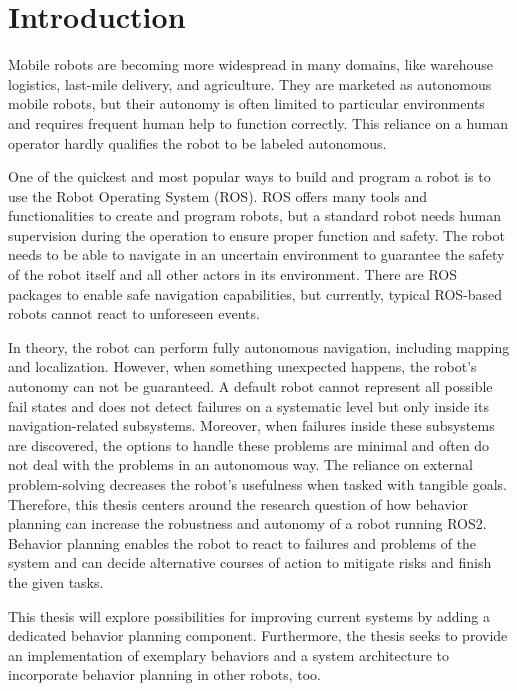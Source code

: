 \chapter{Introduction}
\label{cha:introduction}

Mobile robots are becoming more widespread in many domains, like warehouse logistics, last-mile delivery, and agriculture. They are marketed as autonomous mobile robots, but their autonomy is often limited to particular environments and requires frequent human help to function correctly. This reliance on a human operator hardly qualifies the robot to be labeled autonomous. 

One of the quickest and most popular ways to build and program a robot is to use the Robot Operating System (ROS). ROS offers many tools and functionalities to create and program robots, but a standard robot needs human supervision during the operation to ensure proper function and safety. The robot needs to be able to navigate in an uncertain environment to guarantee the safety of the robot itself and all other actors in its environment. There are ROS packages to enable safe navigation capabilities, but currently, typical ROS-based robots cannot react to unforeseen events.

In theory, the robot can perform fully autonomous navigation, including mapping and localization. However, when something unexpected happens, the robot's autonomy can not be guaranteed. A default robot cannot represent all possible fail states and does not detect failures on a systematic level but only inside its navigation-related subsystems. Moreover, when failures inside these subsystems are discovered, the options to handle these problems are minimal and often do not deal with the problems in an autonomous way. The reliance on external problem-solving decreases the robot's usefulness when tasked with tangible goals. 
Therefore, this thesis centers around the research question of how behavior planning can increase the robustness and autonomy of a robot running ROS2. Behavior planning enables the robot to react to failures and problems of the system and can decide alternative courses of action to mitigate risks and finish the given tasks.

This thesis will explore possibilities for improving current systems by adding a dedicated behavior planning component. Furthermore, the thesis seeks to provide an implementation of exemplary behaviors and a system architecture to incorporate behavior planning in other robots, too.


